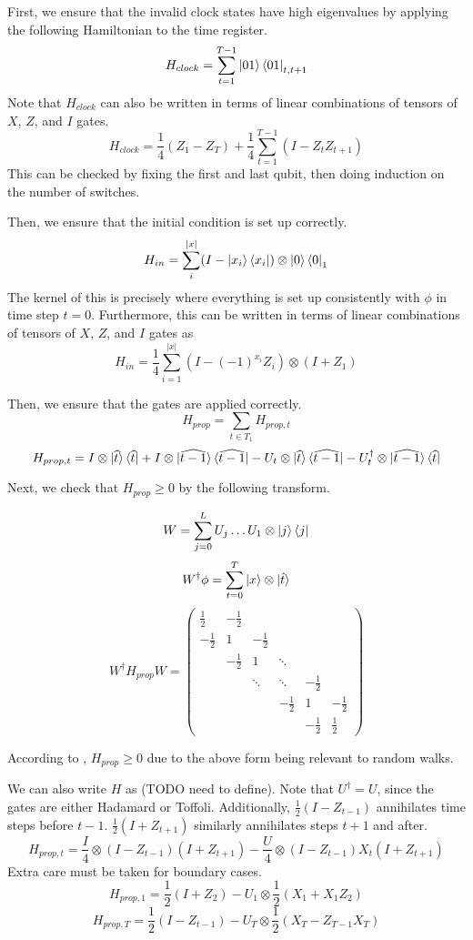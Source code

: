 First, we ensure that the invalid clock states have high eigenvalues by applying the following Hamiltonian to the time register.
$$H_{clock}=\sum_{t=1}^{T-1}\ket{01}\bra{01}_{t,t+1}$$
Note that $H_{clock}$ can also be written in terms of linear combinations of tensors of $X$, $Z$, and $I$ gates.
$$H_{clock}=\frac{1}{4}(Z_1 - Z_T) + \frac{1}{4}\sum_{t=1}^{T-1}(I-Z_tZ_{t+1}) $$
This can be checked by fixing the first and last qubit, then doing induction on the number of switches.

Then, we ensure that the initial condition is set up correctly.
$$H_{in}=\sum_i^{|x|}(I-\ket{x_i}\bra{x_i})\otimes\ket{0}\bra{0}_1$$
The kernel of this is precisely where everything is set up consistently with $\phi$ in time step $t=0$. Furthermore, this can be written in terms of linear combinations of tensors of $X$, $Z$, and $I$ gates as
$$H_{in}=\frac{1}{4}\sum_{i=1}^{|x|}(I-(-1)^{x_i}Z_i)\otimes(I+Z_1)$$

Then, we ensure that the gates are applied correctly.
$$H_{prop}=\sum_{t\in T_1}H_{prop,t}$$
$$H_{prop,t}=I\otimes\ket{\widehat{t}}\bra{\widehat{t}}
	+I\otimes\ket{\widehat{t-1}}\bra{\widehat{t-1}}
	-U_t\otimes\ket{\widehat{t}}\bra{\widehat{t-1}}
	-U_t^\dagger\otimes\ket{\widehat{t-1}}\bra{\widehat{t}}$$

Next, we check that $H_{prop}\geq0$ by the following transform.

$$W=\sum_{j=0}^L U_j\ldots U_1\otimes\ket{j}\bra{j}$$
$$W^\dagger\phi=\sum_{t=0}^T\ket{x}\otimes\ket{\hat{t}}$$
$$W^\dagger H_{prop} W=
\begin{pmatrix}
	\frac{1}{2} & -\frac{1}{2} & & & &  \\
	-\frac{1}{2} & 1 & -\frac{1}{2} & & & \\
	& -\frac{1}{2} & 1 & \ddots & & \\
	& & \ddots & \ddots & -\frac{1}{2} & \\
	& & & -\frac{1}{2} & 1 & -\frac{1}{2} \\
	& & & & -\frac{1}{2} & \frac{1}{2}
\end{pmatrix}$$

According to \cite{2002quant.ph.10077A}, $H_{prop}\geq 0$ due to the above form being relevant to random walks.

We can also write $H$ as (TODO need to define).
Note that $U^\dagger=U$, since the gates are either Hadamard or Toffoli. Additionally, $\frac{1}{2}(I-Z_{t-1})$ annihilates time steps before $t-1$. $\frac{1}{2}(I+Z_{t+1})$ similarly annihilates steps $t+1$ and after.
$$H_{prop,t}=\frac{I}{4}\otimes(I-Z_{t-1})(I+Z_{t+1})-\frac{U}{4}\otimes(I-Z_{t-1})X_t(I+Z_{t+1})$$
Extra care must be taken for boundary cases.
$$H_{prop,1}=\frac{1}{2}(I+Z_2)-U_1\otimes\frac{1}{2}(X_1+X_1Z_2)$$
$$H_{prop,T}=\frac{1}{2}(I-Z_{t-1})-U_T\otimes\frac{1}{2}(X_T-Z_{T-1}X_T)$$

